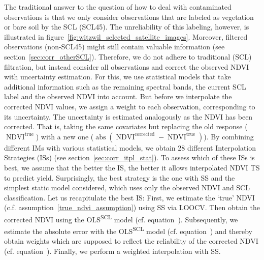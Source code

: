 The traditional answer to the question of how to deal with contaminated observations is that we only consider observations that are labeled as vegetation or bare soil by the SCL (SCL45). The unreliability of this labeling, however, is illustrated in figure~\ref{fig:witzwil_selected_satellite_images}. Moreover, filtered observations (non-SCL45) might still contain valuable information (see section~\ref{sec:corr_otherSCL}). Therefore, we do not adhere to traditional (SCL) filtration, but instead consider all observations and correct the observed NDVI with uncertainty estimation. For this, we use statistical models that take additional information such as the remaining spectral bands, the current SCL label and the observed NDVI into account. But before we interpolate the corrected NDVI values, we assign a weight to each observation, corresponding to its uncertainty. The uncertainty is estimated analogously as the NDVI has been corrected. That is, taking the same covariates but replacing the old response ($\operatorname{NDVI}^\text{true}$) with a new one ($\operatorname{abs}(\operatorname{NDVI}^\text{corrected}-\operatorname{NDVI}^\text{true})$).
    By combining different {{IM}}s with various statistical models, we obtain 28 different Interpolation Strategies ({{IS}}s) (see section~\ref{sec:corr_itpl_stat}). To assess which of these {{IS}}s is best, we assume that the better the {{IS}}, the better it allows interpolated NDVI {TS} to predict yield. Surprisingly, the best strategy is the one with SS and the simplest static model considered, which uses only the observed NDVI and SCL classification.
Let us recapitulate the best {{IS}}: First, we estimate the `true' NDVI (c.f. assumption~\ref{true_ndvi_assumption}) using SS via LOOCV. Then obtain the corrected NDVI using the OLS\textsuperscript{SCL} model (cf. equation~). Subsequently, we estimate the absolute error with the OLS\textsuperscript{SCL} model (cf. equation~) and thereby obtain weights which are supposed to reflect the reliability of the corrected NDVI (cf. equation~). Finally, we perform a weighted interpolation with SS.


